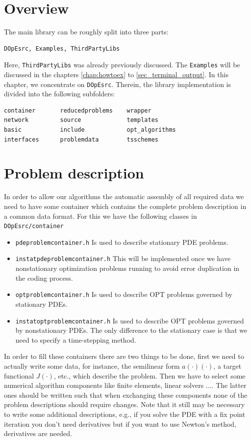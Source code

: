 \section{Overview}
The main library can be roughly split into three parts:
\begin{verbatim}
DOpEsrc, Examples, ThirdPartyLibs
\end{verbatim}
Here, \texttt{ThirdPartyLibs} was already previously discussed.
The \texttt{Examples} will be discussed in the chapters \ref{chap:howtoex}
to \ref{sec_terminal_output}. In this chapter, we concentrate on 
\texttt{DOpEsrc}. Therein, the library implementation is divided into the following 
subfolders:
\begin{verbatim}
container       reducedproblems    wrapper
network         source             templates
basic           include            opt_algorithms  
interfaces      problemdata        tsschemes
\end{verbatim}


\section{Problem description}
In order to allow our algorithms the automatic assembly of all required 
data we need to have some container which contains the complete problem 
description in a common data format. For this we have the following 
classes in \texttt{DOpEsrc/container}
\begin{itemize}
  \item \texttt{pdeproblemcontainer.h} Is used to describe  stationary PDE problems.
  \item \texttt{instatpdeproblemcontainer.h} 
This will be implemented once we have nonstationary optimization problems running to avoid error duplication in the coding process.
  \item \texttt{optproblemcontainer.h} Is used to describe  OPT problems governed by 
    stationary PDEs. 
  \item \texttt{instatoptproblemcontainer.h} Is used to describe  OPT problems governed by nonstationary PDEs. The only difference to the stationary case is that we need to specify a time-stepping method.  
\end{itemize}
In order to fill these containers there are two things to be done,
first we need to actually write some data, for instance,
the semilinear form $a(\cdot)(\cdot)$, a target functional $J(\cdot)$, etc.,
which describe the problem. Then we have to select some numerical 
algorithm components like finite elements, linear solvers $\ldots$.
The latter ones should be written such that when exchanging these components
none of the problem descriptions should require changes. 
Note that it still may be necessary to write some additional descriptions, 
e.g., if you solve the PDE with a fix point iteration you don't need derivatives
but if you want to use Newton's method, derivatives are needed.

